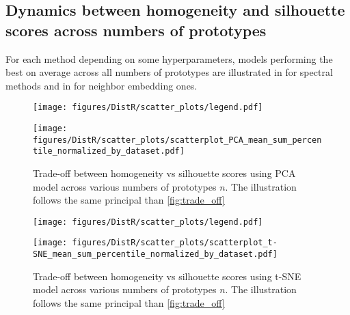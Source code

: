 \subsection{Dynamics between homogeneity and silhouette scores across numbers of prototypes}\label{sec:supp_hom_vs_sil}
For each method depending on some hyperparameters, models performing the best on average across all numbers of prototypes are illustrated in  for spectral methods and in  for neighbor embedding ones. 
	\begin{figure*}[h!]
		\begin{center}
			\centerline{\texttt{[image: figures/DistR/scatter\_plots/legend.pdf]}}\vspace{-1mm}
			\centerline{\texttt{[image: figures/DistR/scatter\_plots/scatterplot\_PCA\_mean\_sum\_percentile\_normalized\_by\_dataset.pdf]}
			}
			\caption{Trade-off between homogeneity vs silhouette scores using PCA model across various numbers of prototypes $n$. The illustration follows the same principal than \cref{fig:trade_off}}
			\label{fig:PCA_hom_vs_sil}
		\end{center}
	\end{figure*}
	\newpage
	\begin{figure*}[h!]
		\begin{center}
			\centerline{\texttt{[image: figures/DistR/scatter\_plots/legend.pdf]}}\vspace{-1mm}
			\centerline{\texttt{[image: figures/DistR/scatter\_plots/scatterplot\_t-SNE\_mean\_sum\_percentile\_normalized\_by\_dataset.pdf]}
			}
			\caption{Trade-off between homogeneity vs silhouette scores using t-SNE model across various numbers of prototypes $n$. The illustration follows the same principal than \cref{fig:trade_off}}
			\label{fig:SNE_hom_vs_sil}
		\end{center}
		\vspace{-0.8cm}
	\end{figure*}

